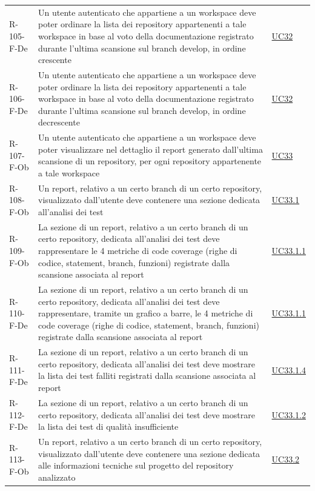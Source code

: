 \documentclass[a4paper, 11pt]{article}
\begin{document}
\begin{longtable}[c]{ >{\centering\arraybackslash}m{2.5cm} >{\centering\arraybackslash}m{8.3cm} >{\centering\arraybackslash}m{3.5cm} }
    R-105-F-De & Un utente autenticato che appartiene a un workspace deve poter ordinare la lista dei repository appartenenti a tale workspace in base al voto della documentazione registrato durante l'ultima scansione sul branch develop, in ordine crescente & \hyperref[UC32]{UC32}\\
    R-106-F-De & Un utente autenticato che appartiene a un workspace deve poter ordinare la lista dei repository appartenenti a tale workspace in base al voto della documentazione registrato durante l'ultima scansione sul branch develop, in ordine decrescente & \hyperref[UC32]{UC32}\\
    R-107-F-Ob & Un utente autenticato che appartiene a un workspace deve poter visualizzare nel dettaglio il report generato dall'ultima scansione di un repository, per ogni repository appartenente a tale workspace & \hyperref[UC33]{UC33}\\
    R-108-F-Ob & Un report, relativo a un certo branch di un certo repository, visualizzato dall'utente deve contenere una sezione dedicata all'analisi dei test & \hyperref[UC33.1]{UC33.1}\\
    R-109-F-Ob & La sezione di un report, relativo a un certo branch di un certo repository, dedicata all'analisi dei test deve rappresentare le 4 metriche di code coverage (righe di codice, statement, branch, funzioni) registrate dalla scansione associata al report & \hyperref[UC33.1.1]{UC33.1.1}\\
    R-110-F-De & La sezione di un report, relativo a un certo branch di un certo repository, dedicata all'analisi dei test deve rappresentare, tramite un grafico a barre, le 4 metriche di code coverage (righe di codice, statement, branch, funzioni) registrate dalla scansione associata al report & \hyperref[UC33.1.1]{UC33.1.1}\\
    R-111-F-De & La sezione di un report, relativo a un certo branch di un certo repository, dedicata all'analisi dei test deve mostrare la lista dei test falliti registrati dalla scansione associata al report & \hyperref[UC33.1.4]{UC33.1.4}\\
    R-112-F-De & La sezione di un report, relativo a un certo branch di un certo repository, dedicata all'analisi dei test deve mostrare la lista dei test di qualità insufficiente & \hyperref[UC33.1.2]{UC33.1.2}\\
    R-113-F-Ob & Un report, relativo a un certo branch di un certo repository, visualizzato dall'utente deve contenere una sezione dedicata alle informazioni tecniche sul progetto del repository analizzato & \hyperref[UC33.2]{UC33.2}\\

\end{longtable}
\end{document}
